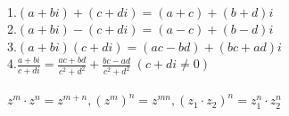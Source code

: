\begin{minipage}[b][14cm][t]{\textwidth}
\begin{tabularx}{\textwidth}{lX}
\\ \hline
\end{tabularx}
\begin{Large}
  \begin{center}\color{blue}\color{black}\end{center}
   \\
  1.$(a+bi)+(c+di)=(a+c)+(b+d)i$ \\
  2.$(a+bi)-(c+di)=(a-c)+(b-d)i$ \\
  3.$(a+bi)(c+di)=(ac-bd)+(bc+ad)i$ \\
  4.$\frac{a+bi}{c+di}=\frac{ac+bd}{c^2+d^2} + \frac{bc-ad}{c^2+d^2} \hspace{3pt} (c+di \ne 0)$ \\[10pt]
   \\
  $z^m \cdot z^n=z^{m+n},(z^m)^n=z^{mn},(z_1 \cdot z_2)^n=z_1^n \cdot z_2^n$
\end{Large}
\end{minipage}
